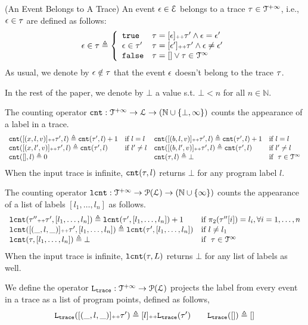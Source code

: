 \begin{defn}(An Event Belongs to A Trace)
  An event $\mathtt{\epsilon} \in \mathcal{E}$ belongs to a trace $\mathtt{\tau} \in \mathcal{T}^{+\infty}$, i.e., $\mathtt{\epsilon} \in \mathtt{\tau}$ are defined as follows:
%
\begin{equation*}
  \event \in \trace  
  \triangleq \left\{
  \begin{array}{ll} 
    \etrue                  & \trace =  [\event] \tracecat \trace'
     \land \event = \event' \\
    \event \in \trace' & \trace =  [\event'] \tracecat \trace'
      \land \event \neq \event' \\ 
    \efalse                 & \trace = [] \lor \trace \in \inftdom
  \end{array}
  \right.
\end{equation*}
As usual, we denote by $\mathtt{\epsilon} \notin \mathtt{\tau}$ that the event $\mathtt{\epsilon}$ doesn't belong to the trace $\mathtt{\tau}$.
\end{defn}
%
In the rest of the paper, we denote by $\bot$ a value s.t. $\bot < n $ for all $n \in \mathbb{N}$.
\begin{defn}
  \label{def:counter}
The counting operator $\mathtt{cnt} : \mathcal{T}^{+\infty} \to \mathcal{L} \to (\mathbb{N} \cup \{\bot, \infty\})$
counts the appearance of a label in a trace.
\[
\begin{array}{llll}
\mathtt{cnt}([(x, l, v)] {\scriptscriptstyle ++} \mathtt{\tau}', l ) \triangleq \mathtt{cnt}(\mathtt{\tau}', l) + 1 & \text{if}~ l = l
&
\mathtt{cnt}([(b, l, v)] {\scriptscriptstyle ++} \mathtt{\tau}', l) \triangleq \mathtt{cnt}(\mathtt{\tau}', l) + 1 & \text{if}~ l = l
\\
\mathtt{cnt}([(x, l', v)] {\scriptscriptstyle ++} \mathtt{\tau}', l) \triangleq \mathtt{cnt}(\mathtt{\tau}', l)   & \text{if}~ l' \neq l
&
\mathtt{cnt}([(b, l', v)] {\scriptscriptstyle ++} \mathtt{\tau}', l) \triangleq \mathtt{cnt}(\mathtt{\tau}', l)   & \text{if}~ l' \neq l
\\
\mathtt{cnt}({[]}, l) \triangleq 0 & 
&
\mathtt{cnt}(\mathtt{\tau}, l) \triangleq \bot & \text{if }~ \mathtt{\tau} \in \mathcal{T}^{\infty}
\end{array}
\]
{When the input trace is infinite, $\mathtt{cnt}(\mathtt{\tau}, l)$ returns $\bot$ for any program label $l$.}
\end{defn}
\begin{defn}
  \label{def:lcounter}
  The counting operator $\mathtt{lcnt} : \mathcal{T}^{+\infty} \to \mathcal{P}(\mathcal{L}) \to (\mathbb{N} \cup \{\infty\})$
  counts the appearance of a list of labels $[l_1, \ldots, l_n]$ as follows.
\[
  \begin{array}{ll}
  \mathtt{lcnt}(\mathtt{\tau}'' {\scriptscriptstyle ++} \mathtt{\tau}', [l_1, \ldots, l_n] ) 
  \triangleq \mathtt{lcnt}(\mathtt{\tau}', [l_1, \ldots, l_n]) + 1  & \text{if}~ \pi_2(\mathtt{\tau}''[i]) = l_i, \forall i = 1, \ldots, n
  \\ 
  \mathtt{lcnt}([(\_, l, \_)] {\scriptscriptstyle ++} \mathtt{\tau}', [l_1, \ldots, l_n] ) 
  \triangleq \mathtt{lcnt}(\mathtt{\tau}', [l_1, \ldots, l_n]) & \text{if}~ l \neq l_1
  \\ 
  \mathtt{lcnt}(\mathtt{\tau}, [l_1, \ldots, l_n] ) 
  \triangleq \bot & \text{if }~ \mathtt{\tau} \in \mathcal{T}^{\infty}
\end{array}
\]
{When the input trace is infinite, $\mathtt{lcnt}(\mathtt{\tau}, L)$ returns $\bot$ for any list of labels as well.}
\end{defn}
%
We define the operator $\mathtt{L}_{\mathtt{{trace}}} : \mathcal{T}^{+\infty} \to \mathcal{P}{(\mathcal{L})}$ projects the label from every event in a trace as a list of program points,
defined as follows,
\[
\mathtt{L}_{\mathtt{{trace}}}([(\_, l, \_)] {\scriptscriptstyle ++} \mathtt{\tau}') \triangleq [l] {\scriptscriptstyle ++} \mathtt{L}_{\mathtt{{trace}}}(\mathtt{\tau}')
\qquad
\mathtt{L}_{\mathtt{{trace}}}([ ]) \triangleq []
\]